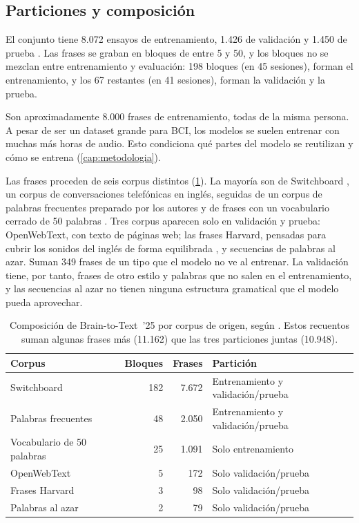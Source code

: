 \subsection{Particiones y composición}

El conjunto tiene 8.072 ensayos de entrenamiento, 1.426 de validación y 1.450 de prueba \cite{lightbeam}. Las frases se graban en bloques de entre 5 y 50, y los bloques no se mezclan entre entrenamiento y evaluación: 198 bloques (en 45 sesiones), forman el entrenamiento, y los 67 restantes (en 41 sesiones), forman la validación y la prueba.

Son aproximadamente 8.000 frases de entrenamiento, todas de la misma persona. A pesar de ser un dataset grande para BCI, los modelos se suelen entrenar con muchas más horas de audio. Esto condiciona qué partes del modelo se reutilizan y cómo se entrena (\cref{cap:metodologia}).

Las frases proceden de seis corpus distintos (\cref{tab:b2t25-splits}). La mayoría son de Switchboard \cite{godfrey1992switchboard}, un corpus de conversaciones telefónicas en inglés, seguidas de un corpus de palabras frecuentes preparado por los autores y de frases con un vocabulario cerrado de 50 palabras \cite{b2t25}. Tres corpus aparecen solo en validación y prueba: OpenWebText, con texto de páginas web; las frases Harvard, pensadas para cubrir los sonidos del inglés de forma equilibrada \cite{ieee1969}, y secuencias de palabras al azar. Suman 349 frases de un tipo que el modelo no ve al entrenar. La validación tiene, por tanto, frases de otro estilo y palabras que no salen en el entrenamiento, y las secuencias al azar no tienen ninguna estructura gramatical que el modelo pueda aprovechar.

\begin{table}[htbp]
  \centering
  \caption[Composición de Brain-to-Text~'25 por corpus de origen]{Composición de Brain-to-Text~'25 por corpus de origen, según \cite{lightbeam}. Estos recuentos suman algunas frases más (11.162) que las tres particiones juntas (10.948).}
  \label{tab:b2t25-splits}
  \small
  \begin{tabular}{lrrl}
    \toprule
    \textbf{Corpus} & \textbf{Bloques} & \textbf{Frases} & \textbf{Partición} \\
    \midrule
 Switchboard                & 182 & 7.672 & Entrenamiento y validación/prueba \\
 Palabras frecuentes        & 48 & 2.050 & Entrenamiento y validación/prueba \\
 Vocabulario de 50 palabras & 25 & 1.091 & Solo entrenamiento \\
 OpenWebText                & 5 & 172 & Solo validación/prueba \\
 Frases Harvard             & 3 & 98 & Solo validación/prueba \\
 Palabras al azar           & 2 & 79 & Solo validación/prueba \\
    \bottomrule
  \end{tabular}
\end{table}

